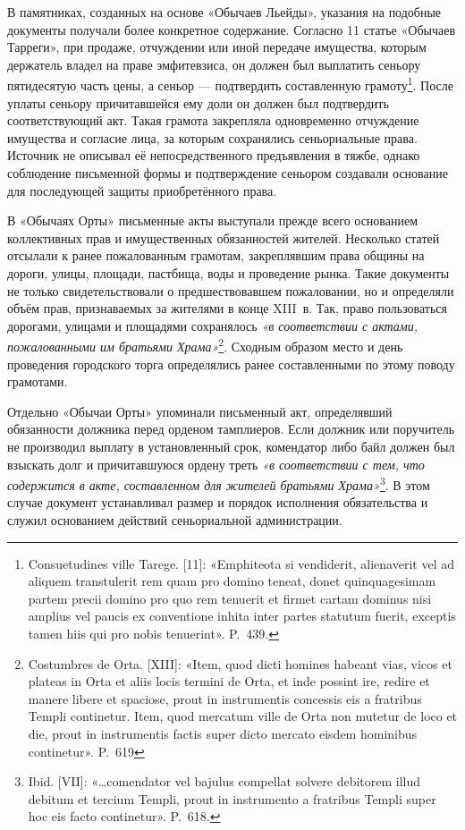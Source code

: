В памятниках, созданных на основе «Обычаев Льейды», указания на подобные документы получали более конкретное содержание. Согласно 11 статье «Обычаев Тарреги», при продаже, отчуждении или иной передаче имущества, которым держатель владел на праве эмфитевзиса, он должен был выплатить сеньору пятидесятую часть цены, а сеньор --- подтвердить составленную грамоту\footnote{Consuetudines ville Tarege. [11]: «Emphiteota si vendiderit, alienaverit vel ad aliquem transtulerit rem quam pro domino teneat, donet quinquagesimam partem precii domino pro quo rem tenuerit et firmet cartam dominus nisi amplius vel paucis ex conventione inhita inter partes statutum fuerit, exceptis tamen hiis qui pro nobis tenuerint». P.~439.}. После уплаты сеньору причитавшейся ему доли он должен был подтвердить соответствующий акт. Такая грамота закрепляла одновременно отчуждение имущества и согласие лица, за которым сохранялись сеньориальные права. Источник не описывал её непосредственного предъявления в тяжбе, однако соблюдение письменной формы и подтверждение сеньором создавали основание для последующей защиты приобретённого права.

В «Обычаях Орты» письменные акты выступали прежде всего основанием коллективных прав и имущественных обязанностей жителей. Несколько статей отсылали к ранее пожалованным грамотам, закреплявшим права общины на дороги, улицы, площади, пастбища, воды и проведение рынка. Такие документы не только свидетельствовали о предшествовавшем пожаловании, но и определяли объём прав, признаваемых за жителями в конце XIII~в. Так, право пользоваться дорогами, улицами и площадями сохранялось \emph{«в соответствии с актами, пожалованными им братьями Храма»}\footnote{Costumbres de Orta. [XIII]: «Item, quod dicti homines habeant vias, vicos et plateas in Orta et aliis locis termini de Orta, et inde possint ire, redire et manere libere et spaciose, prout in instrumentis concessis eis a fratribus Templi continetur. Item, quod mercatum ville de Orta non mutetur de loco et die, prout in instrumentis factis super dicto mercato eisdem hominibus continetur». P.~619}. Сходным образом место и день проведения городского торга определялись ранее составленными по этому поводу грамотами.

Отдельно «Обычаи Орты» упоминали письменный акт, определявший обязанности должника перед орденом тамплиеров. Если должник или поручитель не производил выплату в установленный срок, комендатор либо байл должен был взыскать долг и причитавшуюся ордену треть \emph{«в соответствии с тем, что содержится в акте, составленном для жителей братьями Храма»}\footnote{Ibid. [VII]: «…comendator vel bajulus compellat solvere debitorem illud debitum et tercium Templi, prout in instrumento a fratribus Templi super hoc eis facto continetur». P.~618.}. В этом случае документ устанавливал размер и порядок исполнения обязательства и служил основанием действий сеньориальной администрации.

